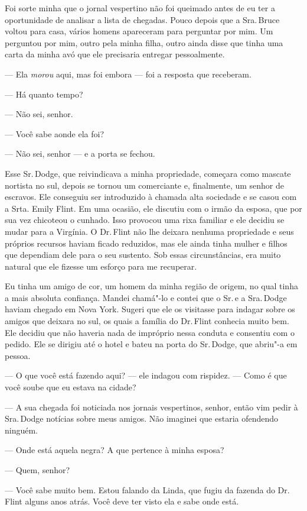 Foi sorte minha que o jornal vespertino
não foi queimado antes de eu ter a oportunidade de analisar a lista de
chegadas. Pouco depois que a Sra.\,Bruce voltou para casa, vários homens
apareceram para perguntar por mim. Um perguntou por mim, outro pela
minha filha, outro ainda disse que tinha uma carta da minha avó que ele
precisaria entregar pessoalmente.

--- Ela \emph{morou} aqui, mas foi
embora --- foi a resposta que receberam.

--- Há quanto tempo?

--- Não sei, senhor.

--- Você sabe aonde ela foi?

--- Não sei, senhor --- e a porta se
fechou.

Esse Sr.\,Dodge, que reivindicava a
minha propriedade, começara como mascate nortista no sul, depois se
tornou um comerciante e, finalmente, um senhor de escravos. Ele
conseguiu ser introduzido à chamada alta sociedade e se casou com a
Srta. Emily Flint. Em uma ocasião, ele discutiu com o irmão da esposa,
que por sua vez chicoteou o cunhado. Isso provocou uma rixa familiar e
ele decidiu se mudar para a Virgínia. O Dr.\,Flint não lhe deixara
nenhuma propriedade e seus próprios recursos haviam ficado reduzidos,
mas ele ainda tinha mulher e filhos que dependiam dele para o seu
sustento. Sob essas circunstâncias, era muito natural que ele fizesse um
esforço para me recuperar.

Eu tinha um amigo de cor, um homem da
minha região de origem, no qual tinha a mais absoluta confiança. Mandei
chamá"-lo e contei que o Sr.\,e a Sra.\,Dodge haviam chegado em Nova York.
Sugeri que ele os visitasse para indagar sobre os amigos que deixara no
sul, os quais a família do Dr.\,Flint conhecia muito bem. Ele decidiu que
não haveria nada de impróprio nessa conduta e consentiu com o pedido.
Ele se dirigiu até o hotel e bateu na porta do Sr.\,Dodge, que abriu"-a em
pessoa.

--- O que você está fazendo aqui? --- ele indagou com rispidez. --- Como
é que você soube que eu estava na cidade?

--- A sua chegada foi noticiada nos
jornais vespertinos, senhor, então vim pedir à Sra.\,Dodge notícias sobre
meus amigos. Não imaginei que estaria ofendendo ninguém.

--- Onde está aquela negra? A que
pertence à minha esposa?

--- Quem, senhor?

--- Você sabe muito bem. Estou falando
da Linda, que fugiu da fazenda do Dr.\,Flint alguns anos atrás. Você deve
ter visto ela e sabe onde está.

